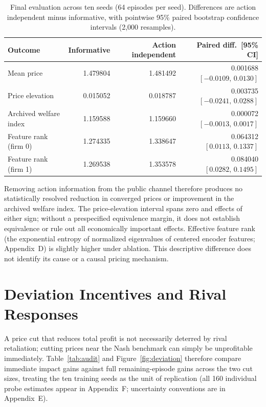 \documentclass{article}
\begin{document}
\begin{table}[t]
\centering
\caption{Final evaluation across ten seeds (64 episodes per seed). Differences are action independent minus informative, with pointwise 95\% paired bootstrap confidence intervals (2{,}000 resamples).}
\label{tab:final}
\begin{tabular}{@{}lrrr@{}}
\toprule
Outcome & Informative & Action independent & Paired diff.\ [95\% CI]\\
\midrule
Mean price
  & 1.479804 & 1.481492 & 0.001688 $[-0.0109,\,0.0130]$\\
Price elevation
  & 0.015052 & 0.018787 & 0.003735 $[-0.0241,\,0.0288]$\\
Archived welfare index
  & 1.159588 & 1.159660 & 0.000072 $[-0.0013,\,0.0017]$\\
Feature rank (firm 0)
  & 1.274335 & 1.338647 & 0.064312 $[0.0113,\,0.1337]$\\
Feature rank (firm 1)
  & 1.269538 & 1.353578 & 0.084040 $[0.0282,\,0.1495]$\\
\bottomrule
\end{tabular}
\end{table}

Removing action information from the public channel therefore produces no statistically resolved reduction in converged prices or improvement in the archived welfare index. The price-elevation interval spans zero and effects of either sign; without a prespecified equivalence margin, it does not establish equivalence or rule out all economically important effects. Effective feature rank (the exponential entropy of normalized eigenvalues of centered encoder features; Appendix~D) is slightly higher under ablation. This descriptive difference does not identify its cause or a causal pricing mechanism.

\section{Deviation Incentives and Rival Responses}

A price cut that reduces total profit is not necessarily deterred by rival retaliation; cutting prices near the Nash benchmark can simply be unprofitable immediately. Table~\ref{tab:audit} and Figure~\ref{fig:deviation} therefore compare immediate impact gains against full remaining-episode gains across the two cut sizes, treating the ten training seeds as the unit of replication (all 160 individual probe estimates appear in Appendix~F; uncertainty conventions are in Appendix~E).
\end{document}
